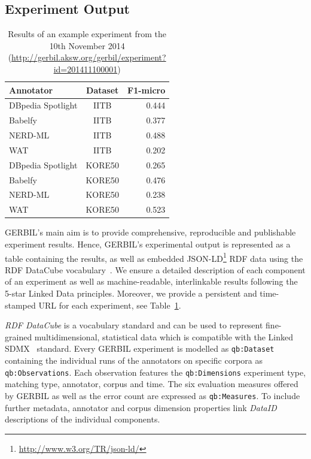 \subsection{Experiment Output}
\label{sec:output}

\begin{table}[tb!]
    \begin{tabular}{lcr}
    \toprule
    Annotator & Dataset & F1-micro \\
    \midrule
    DBpedia Spotlight & IITB & 0.444 \\
    Babelfy & IITB & 0.377 \\
    NERD-ML & IITB & 0.488 \\
    WAT & IITB & 0.202 \\
    DBpedia Spotlight & KORE50 & 0.265 \\
    Babelfy & KORE50 & 0.476 \\
    NERD-ML & KORE50 & 0.238 \\
    WAT & KORE50 & 0.523 \\
	\bottomrule
	\end{tabular}
	\centering
    \caption{Results of an example experiment from the 10th November 2014 (\url{http://gerbil.aksw.org/gerbil/experiment?id=201411100001})}
	\label{tab:persistentURL}
\end{table}

GERBIL's main aim is to provide comprehensive, reproducible and publishable experiment results.
Hence, GERBIL's experimental output is represented as a table containing the results, as well as embedded JSON-LD\footnote{\url{http://www.w3.org/TR/json-ld/}} \ac{RDF} data using the RDF DataCube vocabulary~\cite{datacube}.
We ensure a detailed description of each component of an experiment as well as machine-readable, interlinkable results following the 5-star Linked Data principles.
Moreover, we provide a persistent and time-stamped URL for each experiment, see Table~\ref{tab:persistentURL}.


\emph{RDF DataCube} is a vocabulary standard and can be used to represent fine-grained multidimensional, statistical data which is compatible with the  Linked SDMX~\cite{LinkedSDMX} standard. 
Every GERBIL experiment is modelled as \texttt{qb:Dataset} containing the individual runs of the annotators on specific corpora as \texttt{qb:Observations}. 
Each observation features the \texttt{qb:Dimensions} experiment type, matching type, annotator, corpus and time. 
The six evaluation measures offered by GERBIL as well as the error count are expressed as \texttt{qb:Measures}. 
To include further metadata, annotator and corpus dimension properties link \emph{DataID}~\cite{dataID} descriptions of the individual components. 

